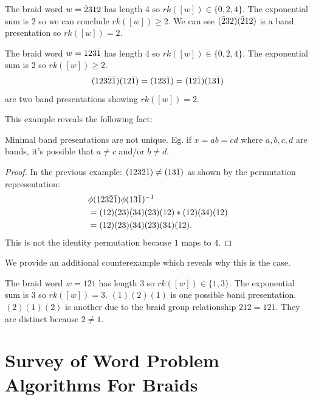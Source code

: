 \documentclass[12pt]{thesis}
\begin{document}
\begin{example}
    The braid word $w = \bar{2} 3 1 2$ has length 4 so $rk([w]) \in \{ 0, 2, 4 \}$.
    The exponential sum is $2$ so we can conclude $rk([w]) \geq 2$.
    We can see $(\bar{2} 3 2) (\bar{2} 1 2)$ is a band presentation so $rk([w]) = 2$.
\end{example}

\begin{example}
    The braid word $w = 1 2 3 \bar{1}$ has length 4 so $rk([w]) \in \{ 0, 2, 4 \}$.
    The exponential sum is $2$ so $rk([w]) \geq 2$.
    \[
        (1 2 3 \bar{2} \bar{1}) (1 2 \bar{1}) = (1 2 3 \bar{1}) = (1 2 \bar{1}) (1 3 \bar{1})
    \]
    are two band presentations showing $rk([w]) = 2$.
\end{example}

This example reveals the following fact:

\begin{proposition}
    Minimal band presentations are not unique.
    Eg. if $x = ab = cd$  where $a, b, c, d$ are bands,
    it's possible that $a \neq c$ and/or $b \neq d$.
\end{proposition}

\begin{proof}
    In the previous example:
    $(1 2 3 \bar{2} \bar{1}) \neq (1 3 \bar{1})$ 
    as shown by the permutation representation:
    \[
        \begin{split}
        &\phi(1 2 3 \bar{2} \bar{1}) \phi( 1 3 \bar{1})^{-1} \\
        &=(12)(23)(34)(23)(12) * (12)(34)(12) \\
        &= (12) (23) (34) (23) (34) (12).
        \end{split}
    \]
    This is not the identity permutation because $1$ maps to $4$.
\end{proof}

We provide an additional counterexample which reveals why this is the case.
\begin{example}
    The braid word $w = 1 2 1$ has length 3 so $rk([w]) \in \{ 1, 3 \}$.
    The exponential sum is $3$ so $rk([w]) = 3$.
    $(1)(2)(1)$ is one possible band presentation.
    $(2)(1)(2)$ is another due to the braid group
    relationship $212 = 121$.
    They are distinct because $2 \neq 1$.
\end{example}

\chapter{Survey of Word Problem Algorithms For Braids}
\end{document}
